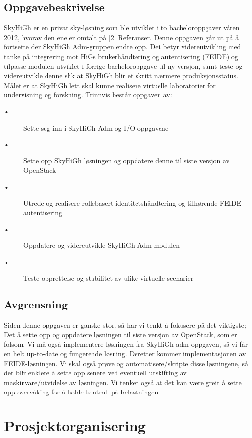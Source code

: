\documentclass[12pt,a4paper]{article}
\newcommand{\tab}{\hspace*{2em}}
\begin{document}
\subsection{Oppgavebeskrivelse}
SkyHiGh er en privat sky-løsning som ble utviklet i to bacheloroppgaver våren 2012, hvorav den ene er omtalt på [2] Referanser. \newline \newline
Denne oppgaven går ut på å fortsette der SkyHiGh Adm-gruppen endte opp. Det betyr
videreutvikling med tanke på integrering mot HiGs brukerhåndtering og autentisering (FEIDE) og
tilpasse modulen utviklet i forrige bacheloroppgave til ny versjon, samt teste og videreutvikle denne slik at SkyHiGh blir et skritt nærmere produksjonsstatus. Målet er at SkyHiGh lett skal kunne realisere virtuelle laboratorier for undervisning og forskning. Trinnvis består oppgaven av:
\begin{description}
	\item[\tab •] Sette seg inn i SkyHiGh Adm og I/O oppgavene
	\item[\tab •] Sette opp SkyHiGh løsningen og oppdatere denne til siste versjon av OpenStack
	\item[\tab •] Utrede og realisere rollebasert identitetshåndtering og tilhørende FEIDE-autentisering
	\item[\tab •] Oppdatere og videreutvikle SkyHiGh Adm-modulen
	\item[\tab •] Teste opprettelse og stabilitet av ulike virtuelle scenarier
\end{description}
\subsection{Avgrensning}
Siden denne oppgaven er ganske stor, så har vi tenkt å fokusere på det viktigste; Det å sette opp og oppdatere løsningen til siste versjon av OpenStack, som er folsom. Vi må også implementere løsningen fra SkyHiGh adm oppgaven, så vi får en helt up-to-date og fungerende løsning. Deretter kommer implementasjonen av FEIDE-løsningen. Vi skal også prøve og automatisere/skripte disse løsningene, så det blir enklere å sette opp senere ved eventuell utskifting av maskinvare/utvidelse av løsningen. Vi tenker også at det kan være greit å sette opp overvåking for å holde kontroll på belastningen. 

\section{Prosjektorganisering}
\end{document}
